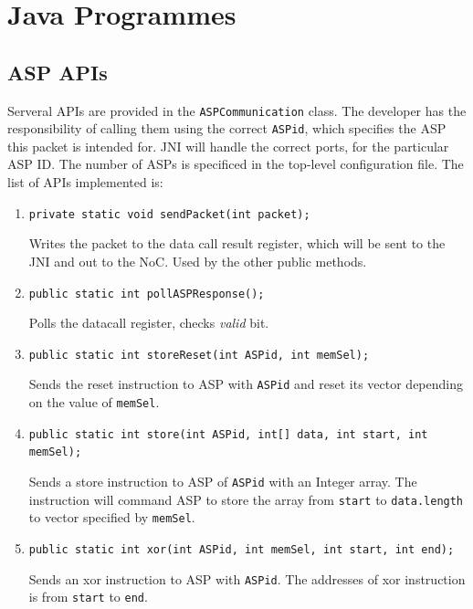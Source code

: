 \documentclass[]{article}
\begin{document}
	
	
	\section{Java Programmes}
	
	\subsection{ASP APIs}
	Serveral APIs are provided in the \texttt{ASPCommunication} class. The developer has the responsibility of calling them using the correct \texttt{ASPid}, which specifies the ASP this packet is intended for. JNI will handle the correct ports, for the particular ASP ID. The number of ASPs is specificed in the top-level configuration file. The list of APIs implemented is:
	\begin{enumerate}
		\item \texttt{private static void sendPacket(int packet);}\par
		Writes the packet to the data call result register, which will be sent to the JNI and out to the NoC. Used by the other public methods.\\ \par
		
		\item \texttt{public static int pollASPResponse();}\par
		Polls the datacall register, checks \emph{valid} bit.\\ \par
		
		\item \texttt{public static int storeReset(int ASPid, int memSel);}\par
		Sends the reset instruction to ASP with \texttt{ASPid} and reset its vector depending on the value of \texttt{memSel}.\\ \par
		
		\item \texttt{public static int store(int ASPid, int[] data, int start, int memSel);}\par
		Sends a store instruction to ASP of \texttt{ASPid} with an Integer array. The instruction will command ASP to store the array from \texttt{start} to \texttt{data.length} to vector specified by \texttt{memSel}.\\ \par
		
		\item \texttt{public static int xor(int ASPid, int memSel, int start, int end);}\par
		Sends an xor instruction to ASP with \texttt{ASPid}. The addresses of xor instruction is from \texttt{start} to \texttt{end}.\\ \par
		

\end{enumerate}
\end{document}
